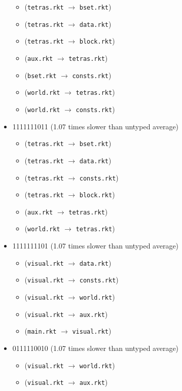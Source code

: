 \documentclass{article}
\newcommand{\mono}[1]{\texttt{#1}}
\begin{document}
\begin{itemize}
\begin{itemize}
  \item (\mono{tetras.rkt} $\rightarrow$ \mono{bset.rkt})
  \item (\mono{tetras.rkt} $\rightarrow$ \mono{data.rkt})
  \item (\mono{tetras.rkt} $\rightarrow$ \mono{block.rkt})
  \item (\mono{aux.rkt} $\rightarrow$ \mono{tetras.rkt})
  \item (\mono{bset.rkt} $\rightarrow$ \mono{consts.rkt})
  \item (\mono{world.rkt} $\rightarrow$ \mono{tetras.rkt})
  \item (\mono{world.rkt} $\rightarrow$ \mono{consts.rkt})
  \end{itemize}
\item 1111111011 (1.07 times slower than untyped average)
  \begin{itemize}
  \item (\mono{tetras.rkt} $\rightarrow$ \mono{bset.rkt})
  \item (\mono{tetras.rkt} $\rightarrow$ \mono{data.rkt})
  \item (\mono{tetras.rkt} $\rightarrow$ \mono{consts.rkt})
  \item (\mono{tetras.rkt} $\rightarrow$ \mono{block.rkt})
  \item (\mono{aux.rkt} $\rightarrow$ \mono{tetras.rkt})
  \item (\mono{world.rkt} $\rightarrow$ \mono{tetras.rkt})
  \end{itemize}
\item 1111111101 (1.07 times slower than untyped average)
  \begin{itemize}
  \item (\mono{visual.rkt} $\rightarrow$ \mono{data.rkt})
  \item (\mono{visual.rkt} $\rightarrow$ \mono{consts.rkt})
  \item (\mono{visual.rkt} $\rightarrow$ \mono{world.rkt})
  \item (\mono{visual.rkt} $\rightarrow$ \mono{aux.rkt})
  \item (\mono{main.rkt} $\rightarrow$ \mono{visual.rkt})
  \end{itemize}
\item 0111110010 (1.07 times slower than untyped average)
  \begin{itemize}
  \item (\mono{visual.rkt} $\rightarrow$ \mono{world.rkt})
  \item (\mono{visual.rkt} $\rightarrow$ \mono{aux.rkt})

\end{itemize}
\end{itemize}
\end{document}
